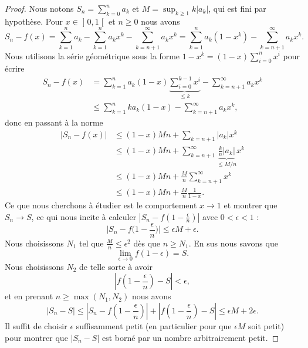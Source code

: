 \begin{proof}
	Nous notons \( S_n=\sum_{k=0}^na_k\) et \( M=\sup_{k\geq 1}k| a_k |\), qui est fini par hypothèse. Pour \( x\in \mathopen] 0 , 1 \mathclose[\) et \( n\geq 0\) nous avons
	\begin{equation}
		S_n-f(x)=\sum_{k=1}^na_k-\sum_{k=1}^na_kx^k-\sum_{k=n+1}^{\infty}a_kx^k=\sum_{k=1}^na_k(1-x^k)-\sum_{k=n+1}^{\infty}a_kx^k.
	\end{equation}
	Nous utilisons la série géométrique sous la forme \( 1-x^k=(1-x)\sum_{i=0}^nx^i\) pour écrire
	\begin{subequations}
		\begin{align}
			S_n-f(x) & =\sum_{k=1}^na_k(1-x)\underbrace{\sum_{i=0}^{k-1}x^i}_{\leq k}-\sum_{k=n+1}^{\infty}a_kx^k \\
			         & \leq\sum_{k=1}^nka_k(1-x)-\sum_{k=n+1}^{\infty}a_kx^k,
		\end{align}
	\end{subequations}
	donc en passant à la norme
	\begin{subequations}
		\begin{align}
			\big| S_n-f(x) \big| & \leq (1-x)Mn+\sum_{k=n+1}| a_k |x^k                                                 \\
			                     & \leq (1-x)Mn+\sum_{k=n+1}^{\infty}\underbrace{\frac{ k }{ n }| a_k |}_{\leq M/n}x^k \\
			                     & \leq (1-x)Mn+\frac{ M }{ n }\sum_{k=n+1}^{\infty}x^k                                \\
			                     & \leq (1-x)Mn+\frac{ M }{ n }\frac{1}{ 1-x }.
		\end{align}
	\end{subequations}
	Ce que nous cherchons à étudier est le comportement \( x\to 1\) et montrer que \( S_n\to S\), ce qui nous incite à calculer \( | S_n-f(1-\frac{ \epsilon }{n  }) |\) avec \( 0<\epsilon<1\) :
	\begin{equation}
		\big| S_n-f\big( 1-\frac{ \epsilon }{ n } \big) \big|\leq \epsilon M+\epsilon.
	\end{equation}
	Nous choisissons \( N_1\) tel que \( \frac{ M }{ n }\leq \epsilon^2\) dès que \( n\geq N_1\). En sus nous savons que
	\begin{equation}
		\lim_{\epsilon\to 0}f(1-\epsilon)=S.
	\end{equation}
	Nous choisissons \( N_2\) de telle sorte à avoir
	\begin{equation}
		\left| f\left( 1-\frac{ \epsilon }{ n } \right)-S \right| <\epsilon,
	\end{equation}
	et en prenant \( n\geq\max(N_1,N_2)\) nous avons
	\begin{equation}
		| S_n-S |\leq \left| S_n-f\left( 1-\frac{ \epsilon }{ n } \right) \right| +\left| f\left( 1-\frac{ \epsilon }{ n } \right)-S \right|  \leq \epsilon M+2\epsilon.
	\end{equation}
	Il suffit de choisir \( \epsilon\) suffisamment petit (en particulier pour que \( \epsilon M\) soit petit) pour montrer que \( | S_n-S |\) est borné par un nombre arbitrairement petit.
\end{proof}

